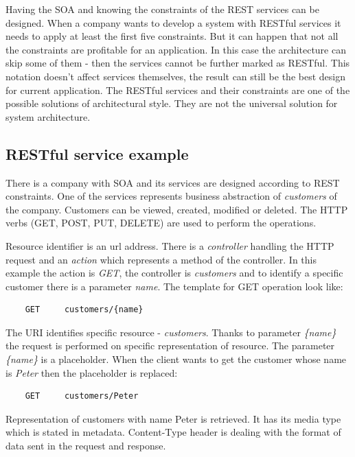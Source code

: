Having the SOA and knowing the constraints of the REST services can be designed. When a company wants to develop a system with RESTful services it needs to apply at least the first five constraints. But it can happen that not all the constraints are profitable for an application. In this case the architecture can skip some of them - then the services cannot be further marked as RESTful. This notation doesn't affect services themselves, the result can still be the best design for current application. The RESTful services and their constraints are one of the possible solutions of architectural style. They are not the universal solution for system architecture.

\subsection{RESTful service example}
There is a company with SOA and its services are designed according to REST constraints. One of the services represents business abstraction of \emph{customers} of the company. Customers can be viewed, created, modified or deleted. The HTTP verbs (GET, POST, PUT, DELETE) are used to perform the operations. 

Resource identifier is an \gls{url} address. There is a \emph{controller} handling the HTTP request and an \emph{action} which represents a method of the controller. In this example the action is \emph{GET}, the controller is \emph{customers} and to identify a specific customer there is a parameter \emph{name}. The template for GET operation look like:

\begin{lstlisting}
    GET     customers/{name} 
\end{lstlisting}


The URI identifies specific resource - \emph{customers}. Thanks to parameter \emph{\{name\}} the request is performed on specific representation of resource. The parameter \emph{\{name\}} is a placeholder. When the client wants to get the customer whose name is \emph{Peter} then the placeholder is replaced:

\begin{lstlisting}
    GET     customers/Peter 
\end{lstlisting}

Representation of customers with name Peter is retrieved. It has its media type which is stated in metadata. Content-Type header is dealing with the format of data sent in the request and response.

